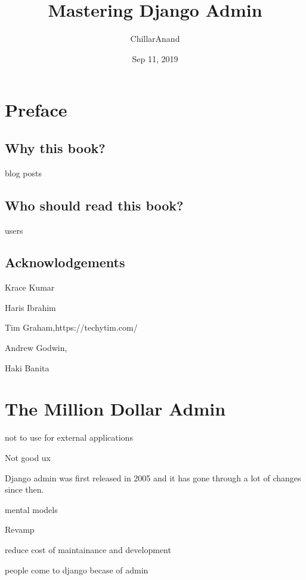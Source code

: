 \documentclass[letterpaper,12pt,english]{sphinxmanual}
\title{Mastering Django Admin}
\date{Sep 11, 2019}
\author{ChillarAnand}
\begin{document}
\pagestyle{empty}
\sphinxmaketitle
\pagestyle{plain}
\sphinxtableofcontents
\pagestyle{normal}
\label{\detokenize{index::doc}}



\chapter{Preface}
\label{\detokenize{preface:preface}}\label{\detokenize{preface::doc}}

\section{Why this book?}
\label{\detokenize{preface:why-this-book}}
blog posts


\section{Who should read this book?}
\label{\detokenize{preface:who-should-read-this-book}}
users


\section{Acknowlodgements}
\label{\detokenize{preface:acknowlodgements}}
Krace Kumar

Haris Ibrahim

Tim Graham,https://techytim.com/

Andrew Godwin, 

Haki Banita



\chapter{The Million Dollar Admin}
\label{\detokenize{admin_million_dollars:the-million-dollar-admin}}\label{\detokenize{admin_million_dollars::doc}}
not to use for external applications

Not good ux

Django admin was first released in 2005 and it has gone through a lot of changes since then.

mental models

Revamp

reduce cost of maintainance and development

people come to django becase of admin

\end{document}
